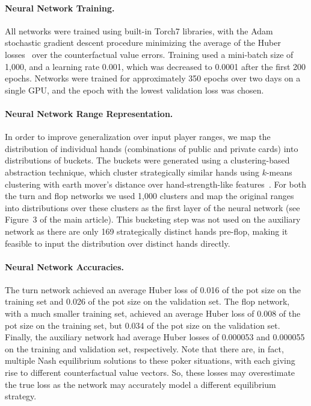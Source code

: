 \paragraph*{Neural Network Training.}
All networks were trained using built-in Torch7 libraries, with the Adam stochastic gradient descent procedure \cite{kingma2014adam} minimizing the average of the Huber losses~\cite{huber1964} over the counterfactual value errors.  Training used a mini-batch size of 1,000, and a learning rate 0.001, which was decreased to 0.0001 after the first 200 epochs. 
Networks were trained for approximately 350 epochs over two days on a single GPU, and the epoch with the lowest validation loss was chosen. 

\paragraph*{Neural Network Range Representation.}
In order to improve generalization over input player ranges, we map the distribution of individual hands (combinations of public and private cards) into distributions of buckets.  The buckets were generated using a clustering-based abstraction technique, which cluster strategically similar hands using $k$-means clustering with earth mover's distance over hand-strength-like features~\cite{Johanson13:Abstraction,Ganzfried14:EMD}.  For both the turn and flop networks we used 1,000 clusters and map the original ranges into distributions over these clusters as the first layer of the neural network (see Figure~3 of the main article).  This bucketing step was not used on the auxiliary network as there are only 169 strategically distinct hands pre-flop, making it feasible to input the distribution over distinct hands directly.

\paragraph*{Neural Network Accuracies.}
The turn network achieved an average Huber loss of 0.016 of the pot size on the training set and 0.026 of the pot size on the validation set.   The flop network, with a much smaller training set, achieved an average Huber loss of 0.008 of the pot size on the training set, but 0.034 of the pot size on the validation set.  Finally, 
 the auxiliary network had average Huber losses of 0.000053 and 0.000055 on the training and validation set, respectively.
Note that there are, in fact, multiple Nash equilibrium solutions to these poker situations, with each giving rise to different counterfactual value vectors.  So, these losses may overestimate the true loss as the network may accurately model a different equilibrium strategy.

